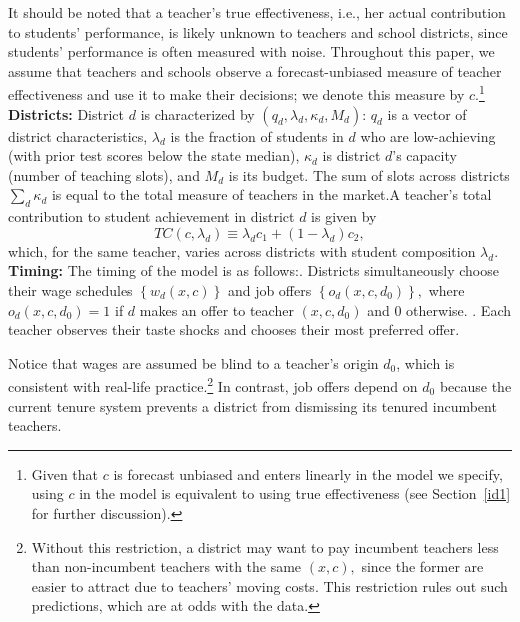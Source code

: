 \documentclass[notitlepage,12pt]{article}%
\begin{document}
It should be noted that a teacher's true effectiveness, i.e., her actual contribution to students' performance, is likely unknown to teachers and school districts, since students' performance is often measured with noise. Throughout this paper, we assume that teachers and schools observe a forecast-unbiased measure of teacher effectiveness and use it to make their decisions; we denote this measure by $c$.\footnote{Given that $c$ is forecast unbiased and enters linearly in the model we specify, using $c$ in the model is equivalent to using true effectiveness (see Section~\ref{id1} for further discussion).}  
\newline\textbf{Districts: }District $d$ is
characterized by $\left(  q_{d},\lambda_{d},\kappa_{d},M_{d}\right)  $:
$q_{d}$ is a vector of district characteristics, $\lambda_{d}$ is the fraction
of students in $d$ who are low-achieving (with prior test scores below the
state median), $\kappa_{d}$ is district $d$'s capacity (number of teaching
slots), and $M_{d}$ is its budget. The sum of slots across districts $\sum
_{d}\kappa_{d}$ is equal to the total measure of teachers in the
market.\newline A teacher's total contribution to student achievement
in district $d$\textbf{ }is given by\
\begin{equation}
TC\left(  c,\lambda_{d}\right)  \equiv\lambda_{d}c_{1}+\left(  1-\lambda
_{d}\right)  c_{2}, \label{TC1}%
\end{equation}
which, for the same teacher, varies across districts with student composition
$\lambda_{d}.$\newline\textbf{Timing: }The timing of the model is as
follows:\newline1. Districts simultaneously choose their wage schedules
$\left\{  w_{d}\left(  x,c\right)  \right\}  $ and job offers $\left\{
o_{d}\left(  x,c,d_{0}\right)  \right\}  ,$ where $o_{d}\left(  x,c,d_{0}%
\right)  =1$ if $d$ makes an offer to teacher $\left(  x,c,d_{0}\right)  $ and
$0$ otherwise. \newline2. Each teacher observes their taste shocks and chooses
their most preferred offer.

Notice that wages are assumed be blind to a teacher's origin $d_{0}$, which is
consistent with real-life practice.\footnote{Without this restriction, a
district may want to pay incumbent teachers less than non-incumbent teachers
with the same $\left(  x,c\right)  ,$ since the former are easier to attract
due to teachers' moving costs. This restriction rules out such predictions,
which are at odds with the data.} In contrast, job offers depend on $d_{0}$
because the current tenure system prevents a district from dismissing its
tenured incumbent teachers.
\end{document}
